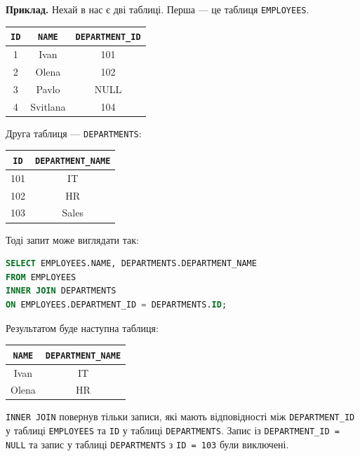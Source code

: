 \documentclass{hw_template}
\begin{document}
\textbf{Приклад.} Нехай в нас є дві таблиці. Перша --- це таблиця \texttt{EMPLOYEES}.

\begin{center}
    \begin{tabular}{|c|c|c|}
        \hline
        \texttt{ID} & \texttt{NAME} & \texttt{DEPARTMENT\_ID} \\
        \hline
        1 & Ivan & 101 \\
        2 & Olena & 102 \\
        3 & Pavlo & NULL \\
        4 & Svitlana & 104 \\
        \hline
    \end{tabular}
\end{center}

Друга таблиця --- \texttt{DEPARTMENTS}:

\begin{center}
    \begin{tabular}{|c|c|}
        \hline
        \texttt{ID} & \texttt{DEPARTMENT\_NAME} \\
        \hline
        101 & IT \\
        102 & HR \\
        103 & Sales \\
        \hline
    \end{tabular}
\end{center}

Тоді запит може виглядати так:
\begin{lstlisting}[language=SQL]
SELECT EMPLOYEES.NAME, DEPARTMENTS.DEPARTMENT_NAME
FROM EMPLOYEES
INNER JOIN DEPARTMENTS
ON EMPLOYEES.DEPARTMENT_ID = DEPARTMENTS.ID;
\end{lstlisting}

Результатом буде наступна таблиця:
\begin{center}
    \begin{tabular}{|c|c|}
        \hline
        \texttt{NAME} & \texttt{DEPARTMENT\_NAME} \\
        \hline
        Ivan & IT \\
        Olena & HR \\
        \hline
    \end{tabular}
\end{center}

\texttt{INNER JOIN} повернув тільки записи, які мають відповідності між
\texttt{DEPARTMENT\_ID} у таблиці \texttt{EMPLOYEES} та \texttt{ID} у таблиці
\texttt{DEPARTMENTS}. Запис із \texttt{DEPARTMENT\_ID = NULL} та запис у таблиці
\texttt{DEPARTMENTS} з \texttt{ID = 103} були виключені.
\end{document}

